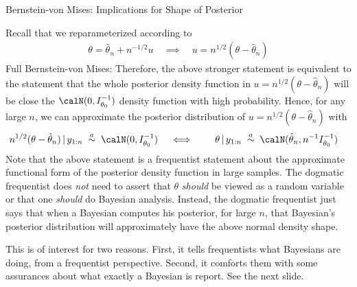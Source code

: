 \documentclass[aspectratio=169, handout]{beamer}
\begin{document}
{\scriptsize
\begin{frame}{Bernstein-von Mises: Implications for Shape of Posterior}


Recall that we reparameterized according to
\begin{align*}
  \theta=\hat{\theta}_n+n^{-1/2}u
  \quad\implies\quad
  u=n^{1/2}(\theta-\hat{\theta}_n)
\end{align*}
\alert{Full Bernstein-von Mises}:
Therefore, the above stronger statement is equivalent to the statement
that the whole posterior density function in
$u=n^{1/2}(\theta-\hat{\theta}_n)$ will be close the
$\calN(0,I_{\theta_0}^{-1})$ density function with high probability.
Hence, for any large $n$, we can approximate the posterior distribution
of $u=n^{1/2}(\theta-\hat{\theta}_n)$ with
\begin{align*}
  n^{1/2}(\theta-\hat{\theta}_n)
  \,|\,y_{1:n}
  \;&\overset{a}{\sim}\;
  \calN(0,I_{\theta_0}^{-1})
  \quad\iff\qquad
  \theta
  \,|\,y_{1:n}
  \;\overset{a}{\sim}\;
  \calN(\hat{\theta}_n,n^{-1}I_{\theta_0}^{-1})
\end{align*}
Note that the above statement is a \alert{frequentist} statement about
the approximate functional form of the posterior density function in
large samples.
The dogmatic frequentist does \emph{not} need to assert that $\theta$
\emph{should} be viewed as a random variable or that one \emph{should}
do Bayesian analysis.
Instead, the dogmatic frequentist just says that when a Bayesian
\alert{computes} his posterior, for large $n$, that Bayesian's posterior
distribution will approximately have the above normal density shape.

This is of interest for two reasons.
First, it tells frequentists what Bayesians are doing, from a
frequentist perspective.
Second, it comforts them with some assurances about what exactly a
Bayesian is report. See the next slide.

\end{frame}
}
\end{document}

